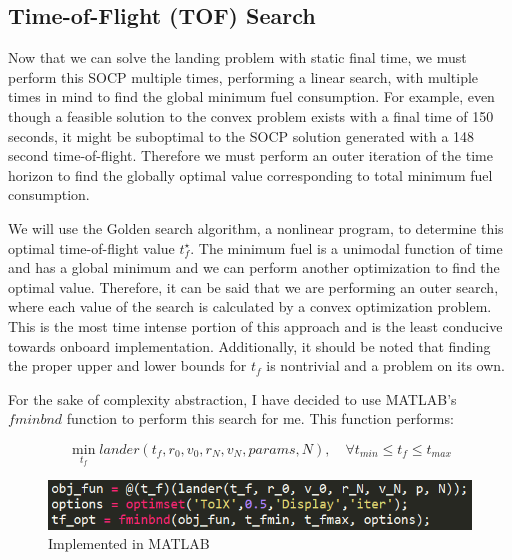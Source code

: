 \documentclass[journal]{new-aiaa}
\begin{document}
\begin{singlespace}
\section{Time-of-Flight (TOF) Search}
Now that we can solve the landing problem with static final time, we must perform this SOCP multiple times, performing a linear search, with multiple times in mind to find the global minimum fuel consumption. For example, even though a feasible solution to the convex problem exists with a final time of 150 seconds, it might be suboptimal to the SOCP solution generated with a 148 second time-of-flight. Therefore we must perform an outer iteration of the time horizon to find the globally optimal value corresponding to total minimum fuel consumption.

We will use the Golden search algorithm, a nonlinear program, to determine this optimal time-of-flight value $t_f^\star$. The minimum fuel is a unimodal function of time and has a global minimum and we can perform another optimization to find the optimal value. Therefore, it can be said that we are performing an outer search, where each value of the search is calculated by a convex optimization problem. This is the most time intense portion of this approach and is the least conducive towards onboard implementation. Additionally, it should be noted that finding the proper upper and lower bounds for $t_f$ is nontrivial and a problem on its own.

For the sake of complexity abstraction, I have decided to use MATLAB's $fminbnd$ function to perform this search for me. This function performs:

\begin{equation}
\min_{t_f} lander(t_f, r_0, v_0, r_N, v_N, params, N), \quad \forall t_{min} \leq t_f \leq t_{max}
\end{equation}

\begin{figure}[!htb] 
  \centering
  \includegraphics[width=.65\textwidth]{fminbnd.PNG}
  \caption{Implemented in MATLAB}
  \label{fig:fmin}
 \end{figure}
 

\end{singlespace}
\end{document}
